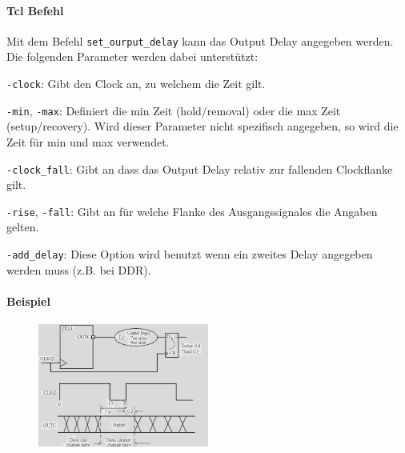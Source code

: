 \paragraph{Tcl Befehl}
Mit dem Befehl \texttt{set\_ourput\_delay} kann das Output Delay angegeben werden. Die folgenden Parameter werden dabei unterstützt:
\begin{compactitem}
    \item \texttt{-clock}: Gibt den Clock an, zu welchem die Zeit gilt.
    \item \texttt{-min}, \texttt{-max}: Definiert die min Zeit (hold/removal) oder die max Zeit (setup/recovery). Wird dieser Parameter nicht spezifisch angegeben, so wird die Zeit für min und max verwendet.
    \item \texttt{-clock\_fall}: Gibt an dass das Output Delay relativ zur fallenden Clockflanke gilt.
    \item \texttt{-rise}, \texttt{-fall}: Gibt an für welche Flanke des Ausgangssignales die Angaben gelten.
    \item \texttt{-add\_delay}: Diese Option wird benutzt wenn ein zweites Delay angegeben werden muss (z.B. bei DDR).
\end{compactitem}

\paragraph{Beispiel}
\begin{figure}[H]
    \includegraphics[width=0.5\textwidth]{images/output_delay.png}
\end{figure}


